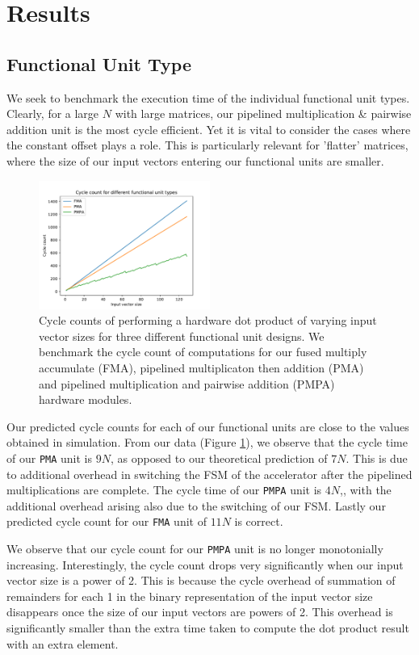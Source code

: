 \documentclass[a4paper,8pt]{report}
\begin{document}
\section{Results}
\subsection{Functional Unit Type}
We seek to benchmark the execution time of the individual functional unit types.
Clearly, for a large $N$ with large matrices, our pipelined multiplication \&
pairwise addition unit is the most cycle efficient. Yet it is vital to consider
the cases where the constant offset plays a role. This is particularly relevant
for 'flatter' matrices, where the size of our input vectors entering our
functional units are smaller.

\begin{figure}[h]
  \centering
  \includegraphics[width=0.5\textwidth]{./py/c2_fut.pdf}
  \caption{Cycle counts of performing a hardware dot product of varying input
    vector sizes for three different functional unit designs. We benchmark the
    cycle count of computations for our fused multiply accumulate (FMA),
    pipelined multiplicaton then addition (PMA) and pipelined multiplication and
    pairwise addition (PMPA) hardware modules.}
  \label{fig:c2_fut}
\end{figure}

Our predicted cycle counts for each of our functional units are close to the
values obtained in simulation.
From our data (Figure \ref{fig:c2_fut}), we observe that the cycle time of our \texttt{PMA} unit is $9N$,
as opposed to our theoretical prediction of $7N$. This is due to additional overhead in
switching the FSM of the accelerator after the pipelined multiplications are
complete. The cycle time of our \texttt{PMPA} unit is $4N$,, with the additional
overhead arising also due to the switching of our FSM. Lastly our predicted
cycle count for our \texttt{FMA} unit of $11N$ is correct.

We observe that our cycle count for our \texttt{PMPA} unit is no longer
monotonially increasing. Interestingly, the cycle count drops very significantly when our input vector
size is a power of 2. This is because the cycle overhead of summation of
remainders for each 1 in the binary representation of the input vector size
disappears once the size of our input vectors are powers of 2. This overhead is
significantly smaller than the extra time taken to compute the dot product
result with an extra element.
\end{document}
